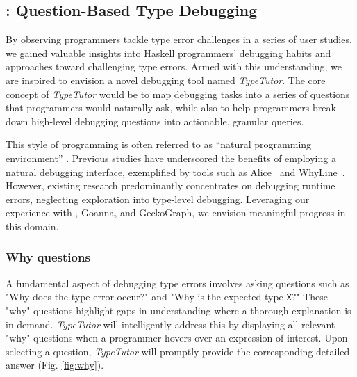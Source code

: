 \subsection*{\typetutor: Question-Based Type Debugging}

By observing programmers tackle type error challenges in a series of user studies, we gained valuable insights into Haskell programmers' debugging habits and approaches toward challenging type errors. Armed with this understanding, we are inspired to envision a novel debugging tool named \textit{TypeTutor}. The core concept of \textit{TypeTutor} would be to map debugging tasks into a series of questions that programmers would naturally ask, while also to help programmers break down high-level debugging questions into actionable, granular queries.

This style of programming is often referred to as ``natural programming environment'' \cite{Myers2004-fy}. Previous studies have underscored the benefits of employing a natural debugging interface, exemplified by tools such as Alice~\cite{Conway2000-nn} and WhyLine~\cite{Ko2009-uf}. However, existing research predominantly concentrates on debugging runtime errors, neglecting exploration into type-level debugging.  Leveraging our experience with \chameleon{}, Goanna, and GeckoGraph, we envision meaningful progress in this domain.


\subsubsection*{Why questions}

A fundamental aspect of debugging type errors involves asking questions such as "Why does the type error occur?" and "Why is the expected type \texttt{X}?" These "why" questions highlight gaps in understanding where a thorough explanation is in demand. \textit{TypeTutor} will intelligently address this by displaying all relevant "why" questions when a programmer hovers over an expression of interest. Upon selecting a question, \textit{TypeTutor} will promptly provide the corresponding detailed answer (Fig. \ref{fig:why}).



